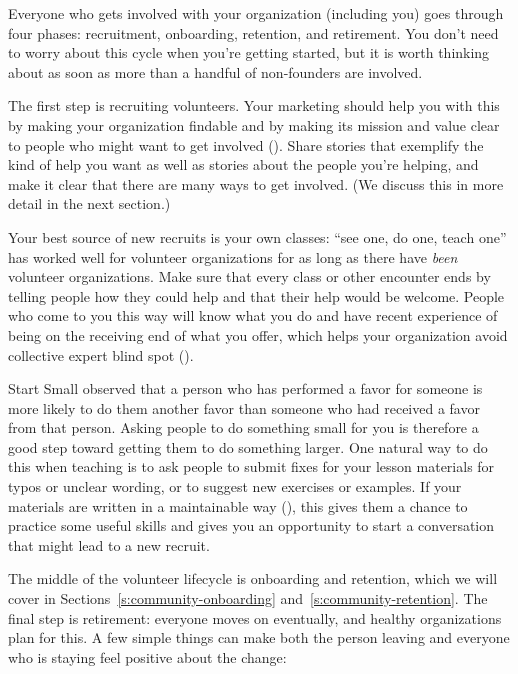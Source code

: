 
Everyone who gets involved with your organization
(including you)
goes through four phases:
recruitment, onboarding, retention, and retirement.
You don't need to worry about this cycle when you're getting started,
but it is worth thinking about
as soon as more than a handful of non-founders are involved.

The first step is recruiting volunteers.
Your marketing should help you with this by making your organization findable
and by making its mission and value clear
to people who might want to get involved
().
Share stories that exemplify the kind of help you want
as well as stories about the people you're helping,
and make it clear that there are many ways to get involved.
(We discuss this in more detail in the next section.)

Your best source of new recruits is your own classes:
``see one, do one, teach one'' has worked well for volunteer organizations
for as long as there have \emph{been} volunteer organizations.
Make sure that every class or other encounter
ends by telling people how they could help and that their help would be welcome.
People who come to you this way will know what you do
and have recent experience of being on the receiving end of what you offer,
which helps your organization avoid collective expert blind spot ().

\begin{aside}{Start Small}
   observed that
  a person who has performed a favor for someone
  is more likely to do them another favor
  than someone who had received a favor from that person.
  Asking people to do something small for you
  is therefore a good step toward getting them to do something larger.
  One natural way to do this when teaching
  is to ask people to submit fixes for your lesson materials for typos or unclear wording,
  or to suggest new exercises or examples.
  If your materials are written in a maintainable way (),
  this gives them a chance to practice some useful skills
  and gives you an opportunity to start a conversation
  that might lead to a new recruit.
\end{aside}

The middle of the volunteer lifecycle is onboarding and retention,
which we will cover in Sections~\ref{s:community-onboarding} and~\ref{s:community-retention}.
The final step is retirement:
everyone moves on eventually,
and healthy organizations plan for this.
A few simple things can make both the person leaving and everyone who is staying
feel positive about the change:

